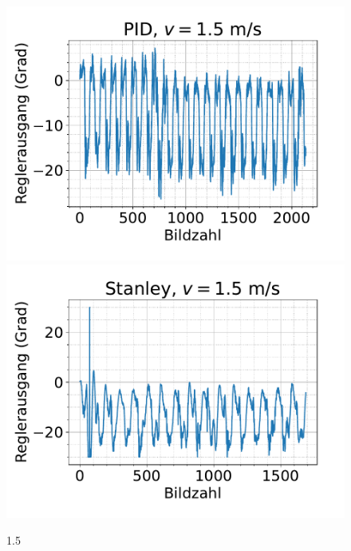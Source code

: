 \documentclass[arbeit=studie,oneside,BCOR=12mm]{ArbeitRST}
\begin{document}
\begin{figure}[h]
    \centering
    \includegraphics[scale=0.47]{pid1.5}
    \includegraphics[scale=0.47]{Stan1.5}
    \caption{1.5}
    \label{ausrei}
\end{figure}
\end{document}
